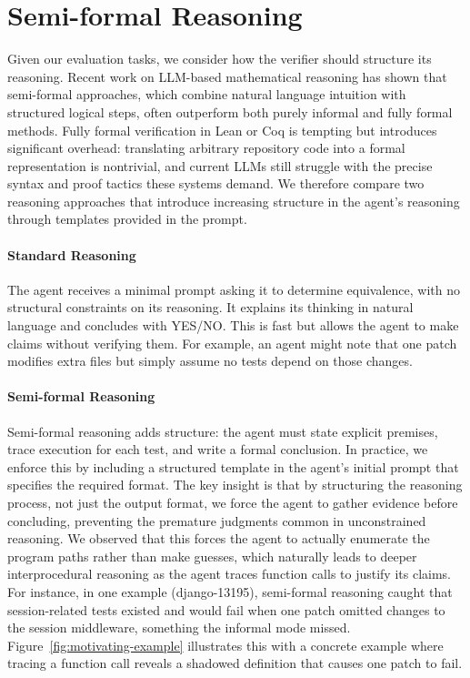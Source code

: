 \documentclass[]{meta}
\begin{document}
\section{Semi-formal Reasoning}
\label{sec:semiformal}
Given our evaluation tasks, we consider how the verifier should structure its reasoning.
Recent work \cite{achim2025aristotleimolevelautomatedtheorem, olympiaddeepmind, yang2025position} on LLM-based mathematical reasoning has shown that semi-formal approaches, which combine natural language intuition with structured logical steps, often outperform both purely informal and fully formal methods. Fully formal verification in Lean or Coq is tempting but introduces significant overhead: translating arbitrary repository code into a formal representation is nontrivial, and current LLMs still struggle with the precise syntax and proof tactics these systems demand. We therefore compare two reasoning approaches that introduce increasing structure in the agent's reasoning through templates provided in the prompt.

\paragraph{Standard Reasoning}
The agent receives a minimal prompt asking it to determine equivalence, with no structural constraints on its reasoning. It explains its thinking in natural language and concludes with YES/NO. This is fast but allows the agent to make claims without verifying them. For example, an agent might note that one patch modifies extra files but simply assume no tests depend on those changes.

\paragraph{Semi-formal Reasoning}
Semi-formal reasoning adds structure: the agent must state explicit premises, trace execution for each test, and write a formal conclusion. In practice, we enforce this by including a structured template in the agent's initial prompt that specifies the required format.
The key insight is that by structuring the reasoning process, not just the output format, we force the agent to gather evidence before concluding, preventing the premature judgments common in unconstrained reasoning.
We observed that this forces the agent to actually enumerate the program paths rather than make guesses, which naturally leads to deeper interprocedural reasoning as the agent traces function calls to justify its claims.
For instance, in one example (django-13195), semi-formal reasoning caught that session-related tests existed and would fail when one patch omitted changes to the session middleware, something the informal mode missed.
Figure~\ref{fig:motivating-example} illustrates this with a concrete example where tracing a function call reveals a shadowed definition that causes one patch to fail.
\end{document}
